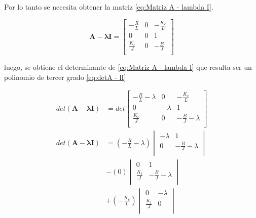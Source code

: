 Por lo tanto se necesita obtener la matriz \eqref{eq:Matriz A - lambda I}.

\begin{equation}
  \mathbf{A-\lambda I} =
  \begin{bmatrix}
  -\frac{R}{L}          & 0        & -\frac{K_e}{L}   \\
  0                     & 0        &  1               \\
  \frac{K_t}{J}         & 0        & -\frac{B}{J}     \\
  \end{bmatrix}
  \label{eq:Matriz A - lambda I}
\end{equation}

luego, se obtiene el determinante de \eqref{eq:Matriz A - lambda I}
que resulta ser un polinomio de tercer grado \eqref{eq:detA - lI}

\begin{align*}
  det\left(\mathbf{A-\lambda I}\right) &=
  det\begin{bmatrix}
  -\frac{R}{L}-\lambda  & 0        & -\frac{K_e}{L}         \\
  0                     & -\lambda &  1                     \\
  \frac{K_t}{J}         & 0        & -\frac{B}{J} - \lambda \\
  \end{bmatrix} \\
  det\left(\mathbf{A-\lambda I}\right) &=
  \left(-\tfrac{R}{L} - \lambda\right)
  \begin{vmatrix}
    -\lambda       &  1                     \\
    0              & -\frac{B}{J} - \lambda \\
  \end{vmatrix}\\
  &-\left(0\right)
  \begin{vmatrix}
    0              &  1                     \\
    \frac{K_t}{J}  & -\frac{B}{J} - \lambda \\
  \end{vmatrix}\\
  &+\left(-\tfrac{K_e}{L}\right)
  \begin{vmatrix}
    0              & -\lambda               \\
    \frac{K_t}{J}  & 0                      \\
  \end{vmatrix}
\end{align*}

